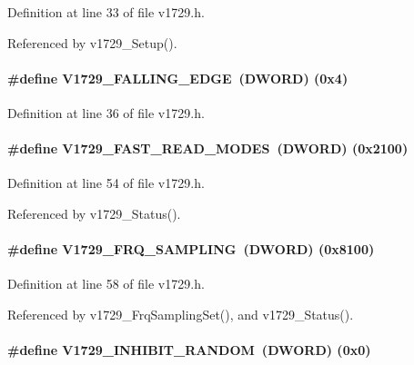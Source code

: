 Definition at line 33 of file v1729.h.

Referenced by v1729\_\-Setup().
\paragraph[{V1729\_\-FALLING\_\-EDGE}]{\setlength{\rightskip}{0pt plus 5cm}\#define V1729\_\-FALLING\_\-EDGE~({\bf DWORD})   (0x4)}\hfill\label{v1729_8h_aa5ff2087e3a4e4848cfcd6bcc7e045ef}


Definition at line 36 of file v1729.h.
\paragraph[{V1729\_\-FAST\_\-READ\_\-MODES}]{\setlength{\rightskip}{0pt plus 5cm}\#define V1729\_\-FAST\_\-READ\_\-MODES~({\bf DWORD}) (0x2100)}\hfill\label{v1729_8h_a797d65ba16be91e82b89f2d3c4381a35}


Definition at line 54 of file v1729.h.

Referenced by v1729\_\-Status().
\paragraph[{V1729\_\-FRQ\_\-SAMPLING}]{\setlength{\rightskip}{0pt plus 5cm}\#define V1729\_\-FRQ\_\-SAMPLING~({\bf DWORD}) (0x8100)}\hfill\label{v1729_8h_a460741153ccf00fe78b0792128d5e703}


Definition at line 58 of file v1729.h.

Referenced by v1729\_\-FrqSamplingSet(), and v1729\_\-Status().
\paragraph[{V1729\_\-INHIBIT\_\-RANDOM}]{\setlength{\rightskip}{0pt plus 5cm}\#define V1729\_\-INHIBIT\_\-RANDOM~({\bf DWORD})   (0x0)}\hfill\label{v1729_8h_a47f632fccc1f6fbda9cc3775dac77a13}


